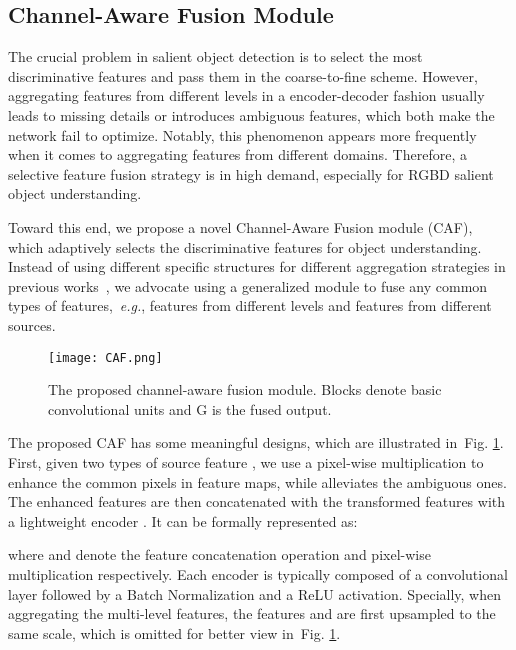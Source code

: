 \documentclass[sigconf]{acmart}
\def\eg{{\em e.g.}}
\newcommand{\figref}[1]{Fig. \ref{#1}}
\begin{document}
\subsection{Channel-Aware Fusion Module} \label{sec:CAF}
The crucial problem in salient object detection is to select the most discriminative features and pass them in the coarse-to-fine scheme. However, aggregating features from different levels in a encoder-decoder fashion usually leads to missing details or introduces ambiguous features, which both make the network fail to optimize. Notably, this phenomenon appears more frequently when it comes to aggregating features from different domains.
Therefore, a selective feature fusion strategy is in high demand, especially for RGBD salient object understanding.

Toward this end, we propose a novel Channel-Aware Fusion module (CAF), which adaptively selects the discriminative features for object understanding. Instead of using different specific structures for different aggregation strategies in previous works~\cite{su2019selectivity,chen2020global,piao2019depth}, we advocate using a generalized module to fuse any common types of features,~\eg, features from different levels and features from different sources.



\begin{figure}[]
	\begin{center}
\texttt{[image: CAF.png]}
		\caption{The proposed channel-aware fusion module. Blocks denote basic convolutional units and G is the fused output.
		}\label{fig:CAF}
	\end{center}
\end{figure}



The proposed CAF has some meaningful designs, which are illustrated in~\figref{fig:CAF}. First, given two types of source feature , we use a pixel-wise multiplication to enhance the common pixels in feature maps, while alleviates the ambiguous ones. The enhanced features are then concatenated with the transformed features with a lightweight encoder . It can be formally represented as:
 
where  and  denote the feature concatenation operation and pixel-wise multiplication respectively. Each encoder  is typically composed of a  convolutional layer followed by a Batch Normalization and a ReLU activation. 
Specially, when aggregating the multi-level features, the features  and  are first upsampled to the same scale, which is omitted for better view in~\figref{fig:CAF}. 
\end{document}
